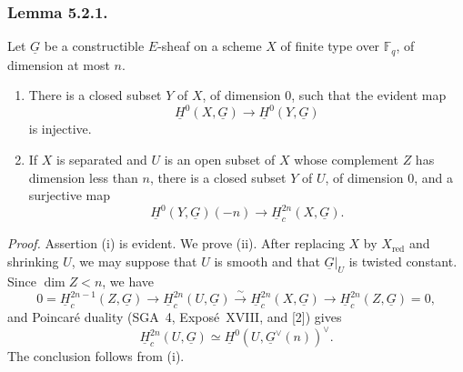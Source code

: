 \subsubsection*{Lemma 5.2.1.}
Let $\underline G$ be a constructible $E$-sheaf on a scheme $X$ of finite
type over $\mathbb F_q$, of dimension at most $n$.

\begin{enumerate}[label=(\roman*)]
\item There is a closed subset $Y$ of $X$, of dimension $0$, such that the
  evident map
  \[
  \underline H^0(X,\underline G)\longrightarrow
  \underline H^0(Y,\underline G)
  \]
  is injective.
\item If $X$ is separated and $U$ is an open subset of $X$ whose complement
  $Z$ has dimension less than $n$, there is a closed subset $Y$ of $U$, of
  dimension $0$, and a surjective map
  \[
  \underline H^0(Y,\underline G)(-n)\longrightarrow
  \underline H_c^{2n}(X,\underline G).
  \]
\end{enumerate}

\medskip
\noindent\emph{Proof.}
Assertion (i) is evident.  We prove (ii).  After replacing $X$ by
$X_{\mathrm{red}}$ and shrinking $U$, we may suppose that $U$ is smooth and
that $\underline G|_U$ is twisted constant.  Since $\dim Z<n$, we have
\[
0=\underline H_c^{2n-1}(Z,\underline G)
\longrightarrow \underline H_c^{2n}(U,\underline G)
\xrightarrow{\sim}\underline H_c^{2n}(X,\underline G)
\longrightarrow \underline H_c^{2n}(Z,\underline G)=0,
\]
and Poincar\'e duality (SGA~4, Expos\'e~XVIII, and [2]) gives
\[
\underline H_c^{2n}(U,\underline G)\simeq
\underline H^0(U,\underline G^\vee(n))^\vee.
\]
The conclusion follows from (i).
